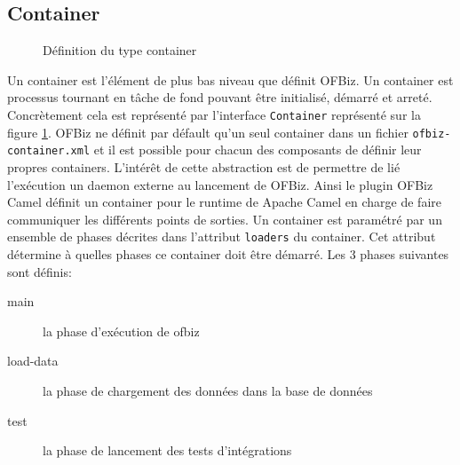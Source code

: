 \documentclass[a4paper, 11pt]{report}
\begin{document}
\subsection{Container}

\begin{figure}
  \centering
  \caption{Définition du type container}
  \label{fig:containertype}
\end{figure}

Un container est l'élément de plus bas niveau que définit OFBiz.  Un
container est processus tournant en tâche de fond pouvant être
initialisé, démarré et arreté.  Concrètement cela est représenté par
l'interface \verb=Container= représenté sur la figure
\ref{fig:containertype}. OFBiz ne définit par défault qu'un seul
container dans un fichier \verb=ofbiz-container.xml= et il est
possible pour chacun des composants de définir leur propres
containers.  L'intérêt de cette abstraction est de permettre de lié
l'exécution un daemon externe au lancement de OFBiz. Ainsi le plugin
OFBiz Camel définit un container pour le runtime de Apache Camel en
charge de faire communiquer les différents points de sorties.  Un
container est paramétré par un ensemble de phases décrites dans
l'attribut \verb=loaders= du container.  Cet attribut détermine à
quelles phases ce container doit être démarré.  Les 3 phases suivantes
sont définis:
\begin{description}
\item[main] la phase d'exécution de ofbiz
\item[load-data] la phase de chargement des données dans la base de
  données
\item[test] la phase de lancement des tests d'intégrations
\end{description}
\end{document}
